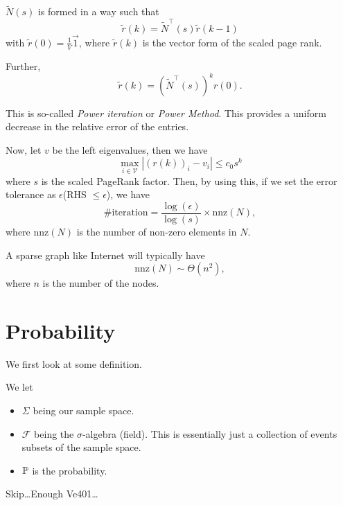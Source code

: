 \begin{answer}
	\(\widetilde{N}(s)\) is formed in a way such that
	\[
		\widetilde{r}(k) = \widetilde{N}^{\top}(s)\widetilde{r}(k - 1)
	\]
	with \(\widetilde{r}(0) = \frac{1}{V}\vec{1}\), where \(\widetilde{r}(k)\) is the vector form of the scaled page rank.

	Further,
	\[
		\widetilde{r}(k) = \left(\widetilde{N}^{\top}(s)\right)^k r(0).
	\]

	This is so-called \emph{Power iteration} or \emph{Power Method}. This provides a uniform decrease in the relative error of the entries.

	Now, let \(v\) be the left eigenvalues, then we have
	\[
		\max_{i\in \mathcal{V}}\left\vert (r(k))_i - v_i\right\vert \leq c_0 s^k
	\]
	where \(s\) is the scaled PageRank factor. Then, by using this, if we set the error tolerance as \(\epsilon\)(RHS \(\leq \epsilon\)), we have
	\[
		\#\text{iteration} = \frac{\log(\epsilon)}{\log(s)}\times \mathrm{nnz}(N),
	\]
	where \(\mathrm{nnz}(N)\) is the number of non-zero elements in \(N\).
	\begin{remark}
		A sparse graph like Internet will typically have
		\[
			\mathrm{nnz}(N)\sim\Theta(n^2),
		\]
		where \(n\) is the number of the nodes.
	\end{remark}
\end{answer}


\section{Probability}
We first look at some definition.
\begin{definition}
	We let
	\begin{itemize}
		\item \(\Sigma\) being our sample space.
		\item \(\mathcal{F}\) being the \(\sigma\)-algebra (field). This is essentially just a collection of events subsets of the sample space.
		\item \(\mathbb{\MakeUppercase{P}}\) is the probability.
	\end{itemize}
\end{definition}

\begin{eg}
	Skip\ldots Enough Ve401\ldots
\end{eg}

